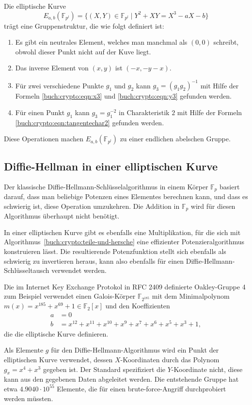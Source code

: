 \begin{satz}
Die elliptische Kurve
\[
E_{a,b}(\mathbb{F}_{p^l})
=
\{
(X,Y)\in\mathbb{F}_{p^l}
\;|\;
Y^2+XY = X^3-aX-b
\}
\]
trägt eine Gruppenstruktur, die wie folgt definiert ist:
\begin{enumerate}
\item Es gibt ein neutrales Element, welches man manchmal als $(0,0)$
schreibt, obwohl dieser Punkt nicht auf der Kuve liegt.
\item Das inverse Element von $(x,y)$ ist $(-x,-y-x)$.
\item Für zwei verschiedene Punkte $g_1$ und $g_2$ kann $g_3=(g_1g_2)^{-1}$
mit Hilfe der Formeln
\eqref{buch:crypto:eqn:x3}
und
\eqref{buch:crypto:eqn:y3}
gefunden werden.
\item Für einen Punkt $g_1$ kann $g_3=g_1^{-2}$ in Charakteristik $2$ mit
Hilfe der Formeln
\eqref{buch:crypto:eqn:tangentechar2}
gefunden werden.
\end{enumerate}
Diese Operationen machen $E_{a,b}(\mathbb{F}_{p^l})$ zu einer endlichen
abelschen Gruppe.
\end{satz}

\subsection{Diffie-Hellman in einer elliptischen Kurve}
Der klassische Diffie-Hellmann-Schlüsselalgorithmus in einem Körper
$\mathbb{F}_p$ basiert darauf, dass man beliebige Potenzen eines 
Elementes berechnen kann, und dass es schwierig ist, diese Operation
umzukehren.
Die Addition in $\mathbb{F}_p$ wird für diesen Algorithmus überhaupt
nicht benötigt.

In einer elliptischen Kurve gibt es ebenfalls eine Multiplikation,
für die sich mit Algorithmus~\ref{buch:crypto:teile-und-hersche}
eine effizienter Potenzieralgorithmus konstruieren lässt.
Die resultierende Potenzfunktion stellt sich ebenfalls als 
schwierig zu invertieren heraus, kann also ebenfalls für einen
Diffie-Hellmann-Schlüsseltausch verwendet werden.

Die im Internet Key Exchange Protokol
in RFC 2409
\cite{buch:rfc2409}
definierte Oakley-Gruppe 4
zum Beispiel verwendet einen Galois-Körper $\mathbb{F}_{2^{185}}$ 
mit dem Minimalpolynom $m(x)=x^{185}+x^{69}+1\in \mathbb{F}_2[x]$
und den Koeffizienten
\begin{align*}
a&=0\\
b&=x^{12}+x^{11} + x^{10} + x^9 + x^7 + x^6 + x^5 + x^3 +1,
\end{align*} 
die die elliptische Kurve definieren.

Als Elemente $g$ für den Diffie-Hellmann-Algorithmus wird ein Punkt
der elliptischen Kurve verwendet, dessen $X$-Koordinaten durch das
Polynom $g_x = x^4+x^3$ gegeben ist.
Der Standard spezifiziert die $Y$-Koordinate nicht, diese kann aus
den gegebenen Daten abgeleitet werden.
Die entstehende Gruppe hat etwa $4.9040\cdot10^{55}$ Elemente, die
für einen brute-force-Angriff durchprobiert werden müssten.








